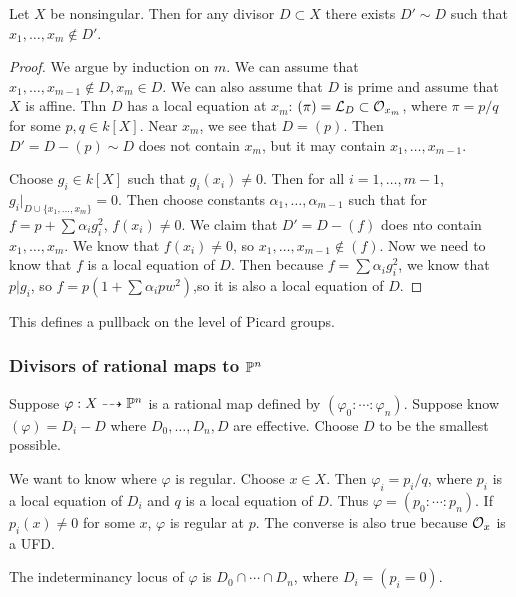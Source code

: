 \documentclass[twoside, 10pt]{article}
\begin{document}
        \begin{lem}
            Let $X$ be nonsingular. Then for any divisor $D \subset X$ there exists $D' \sim D$ such that $x_1, \ldots, x_m \notin D'$.
            \begin{proof}
                We argue by induction on $m$. We can assume that $x_1, \ldots, x_{m-1} \notin D, x_m \in D$. We can also assume that $D$ is prime and assume that $X$ is affine. Thn $D$ has a local equation at $x_m$: $(\pi) = \mc{L}_D \subset \mc{O}_{x_m}$, where $\pi = p/q$ for some $p,q \in k[X]$. Near $x_m$, we see that $D = (p)$. Then $D' = D-(p) \sim D$ does not contain $x_m$, but it may contain $x_1, \ldots, x_{m-1}$.

                Choose $g_i \in k[X]$ such that $g_i(x_i) \neq 0$. Then for all $i = 1, \ldots, m-1$, $g_i|_{D \cup \{x_1, \ldots, x_m\}} = 0.$ Then choose constants $\alpha_1, \ldots, \alpha_{m-1}$ such that for $f = p+\sum\alpha_i g_i^2$, $f(x_i) \neq 0$. We claim that $D' = D-(f)$ does nto contain $x_1, \ldots, x_m$. We know that $f(x_i) \neq 0$, so $x_1, \ldots, x_{m-1} \notin (f)$. Now we need to know that $f$ is a local equation of $D$. Then because $f = \sum \alpha_i g_i^2$, we know that $p|g_i$, so $f = p(1+\sum \alpha_i pw^2)$,so it is also a local equation of $D$.
            \end{proof}
        \end{lem}

        This defines a pullback on the level of Picard groups.

        \subsubsection{Divisors of rational maps to $\P^n$}
        Suppose $\varphi: X \dashrightarrow \P^n$ is a rational map defined by $(\varphi_0: \cdots : \varphi_n)$. Suppose know $(\varphi) = D_i - D$ where $D_0, \ldots, D_n,D$ are effective. Choose $D$ to be the smallest possible.

        We want to know where $\varphi$ is regular. Choose $x \in X$. Then $\varphi_i = p_i/q$, where $p_i$ is a local equation of $D_i$ and $q$ is a local equation of $D$. Thus $\varphi = (p_0: \cdots : p_n).$ If $p_i(x) \neq 0$ for some $x$, $\varphi$ is regular at $p$. The converse is also true because $\mc{O}_x$ is a UFD.
        
        \begin{thm}
            The indeterminancy locus of $\varphi$ is $D_0 \cap \cdots \cap D_n$, where $D_i = (p_i=0)$.
        \end{thm}
\end{document}
